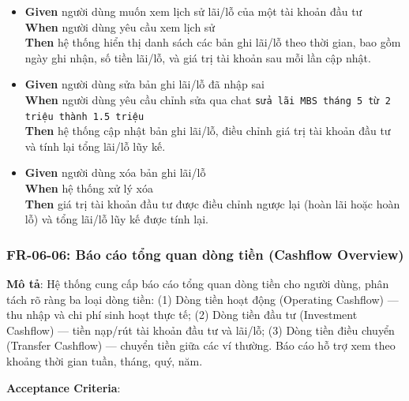 \begin{itemize}
\item \textbf{Given} người dùng muốn xem lịch sử lãi/lỗ của một tài khoản đầu tư  \\ \hspace*{1.5em}  \textbf{When} người dùng yêu cầu xem lịch sử  \\ \hspace*{1.5em}  \textbf{Then} hệ thống hiển thị danh sách các bản ghi lãi/lỗ theo thời gian, bao gồm ngày ghi nhận, số tiền lãi/lỗ, và giá trị tài khoản sau mỗi lần cập nhật.
\item \textbf{Given} người dùng sửa bản ghi lãi/lỗ đã nhập sai  \\ \hspace*{1.5em}  \textbf{When} người dùng yêu cầu chỉnh sửa qua chat \texttt{sửa lãi MBS tháng 5 từ 2 triệu thành 1.5 triệu}  \\ \hspace*{1.5em}  \textbf{Then} hệ thống cập nhật bản ghi lãi/lỗ, điều chỉnh giá trị tài khoản đầu tư và tính lại tổng lãi/lỗ lũy kế.
\item \textbf{Given} người dùng xóa bản ghi lãi/lỗ  \\ \hspace*{1.5em}  \textbf{When} hệ thống xử lý xóa  \\ \hspace*{1.5em}  \textbf{Then} giá trị tài khoản đầu tư được điều chỉnh ngược lại (hoàn lãi hoặc hoàn lỗ) và tổng lãi/lỗ lũy kế được tính lại.
\end{itemize}
\subsubsection{FR-06-06: Báo cáo tổng quan dòng tiền (Cashflow Overview)}

\textbf{Mô tả}: Hệ thống cung cấp báo cáo tổng quan dòng tiền cho người dùng, phân tách rõ ràng ba loại dòng tiền: (1) Dòng tiền hoạt động (Operating Cashflow) — thu nhập và chi phí sinh hoạt thực tế; (2) Dòng tiền đầu tư (Investment Cashflow) — tiền nạp/rút tài khoản đầu tư và lãi/lỗ; (3) Dòng tiền điều chuyển (Transfer Cashflow) — chuyển tiền giữa các ví thường. Báo cáo hỗ trợ xem theo khoảng thời gian tuần, tháng, quý, năm.



\textbf{Acceptance Criteria}:


